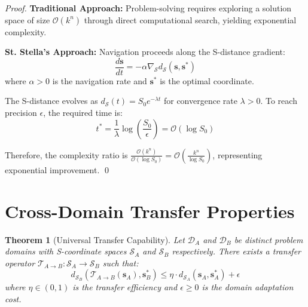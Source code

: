\documentclass[12pt,a4paper]{article}
\newtheorem{theorem}{Theorem}
\begin{document}
\begin{proof}
\textbf{Traditional Approach:} Problem-solving requires exploring a solution space of size $\mathcal{O}(k^n)$ through direct computational search, yielding exponential complexity.

\textbf{St. Stella's Approach:} Navigation proceeds along the S-distance gradient:
\begin{equation}
\frac{d\mathbf{s}}{dt} = -\alpha \nabla_{\mathcal{S}} d_{\mathcal{S}}(\mathbf{s}, \mathbf{s}^*)
\end{equation}
where $\alpha > 0$ is the navigation rate and $\mathbf{s}^*$ is the optimal coordinate.

The S-distance evolves as $d_{\mathcal{S}}(t) = S_0 e^{-\lambda t}$ for convergence rate $\lambda > 0$. To reach precision $\epsilon$, the required time is:
\begin{equation}
t^* = \frac{1}{\lambda} \log\left(\frac{S_0}{\epsilon}\right) = \mathcal{O}(\log S_0)
\end{equation}

Therefore, the complexity ratio is $\frac{\mathcal{O}(k^n)}{\mathcal{O}(\log S_0)} = \mathcal{O}\left(\frac{k^n}{\log S_0}\right)$, representing exponential improvement. \qed
\end{proof}

\section{Cross-Domain Transfer Properties}

\begin{theorem}[Universal Transfer Capability]
\label{thm:universal_transfer}
Let $\mathcal{D}_A$ and $\mathcal{D}_B$ be distinct problem domains with S-coordinate spaces $\mathcal{S}_A$ and $\mathcal{S}_B$ respectively. There exists a transfer operator $\mathcal{T}_{A \to B}: \mathcal{S}_A \to \mathcal{S}_B$ such that:
\begin{equation}
d_{\mathcal{S}_B}(\mathcal{T}_{A \to B}(\mathbf{s}_A), \mathbf{s}_B^*) \leq \eta \cdot d_{\mathcal{S}_A}(\mathbf{s}_A, \mathbf{s}_A^*) + \epsilon
\end{equation}
where $\eta \in (0,1)$ is the transfer efficiency and $\epsilon \geq 0$ is the domain adaptation cost.
\end{theorem}
\end{document}
